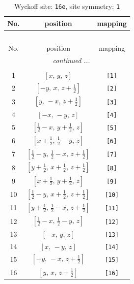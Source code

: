 \documentclass[fleqn,8pt]{jsarticle}
\begin{document}
\begin{longtable}{ccc}
\caption{Wyckoff site: {\tt 16e}, site symmetry: {\tt 1}}
 \\
 \hline \hline
No. & position & mapping \\ \hline \endfirsthead

\multicolumn{2}{l}{\tablename\ \thetable{}} \\
 \hline \hline
No. & position & mapping \\ \hline \endhead

 \hline \hline
\multicolumn{2}{r}{\footnotesize\it continued ...} \\ \endfoot

 \hline \hline
\multicolumn{2}{r}{} \\ \endlastfoot

1 & $\left[ x,\, y,\, z \right]$ & {\tt [1]} \\ \hline
2 & $\left[ - y,\, x,\, z + \frac{1}{2} \right]$ & {\tt [2]} \\ \hline
3 & $\left[ y,\, - x,\, z + \frac{1}{2} \right]$ & {\tt [3]} \\ \hline
4 & $\left[ - x,\, - y,\, z \right]$ & {\tt [4]} \\ \hline
5 & $\left[ \frac{1}{2} - x,\, y + \frac{1}{2},\, z \right]$ & {\tt [5]} \\ \hline
6 & $\left[ x + \frac{1}{2},\, \frac{1}{2} - y,\, z \right]$ & {\tt [6]} \\ \hline
7 & $\left[ \frac{1}{2} - y,\, \frac{1}{2} - x,\, z + \frac{1}{2} \right]$ & {\tt [7]} \\ \hline
8 & $\left[ y + \frac{1}{2},\, x + \frac{1}{2},\, z + \frac{1}{2} \right]$ & {\tt [8]} \\ \hline
9 & $\left[ x + \frac{1}{2},\, y + \frac{1}{2},\, z \right]$ & {\tt [9]} \\ \hline
10 & $\left[ \frac{1}{2} - y,\, x + \frac{1}{2},\, z + \frac{1}{2} \right]$ & {\tt [10]} \\ \hline
11 & $\left[ y + \frac{1}{2},\, \frac{1}{2} - x,\, z + \frac{1}{2} \right]$ & {\tt [11]} \\ \hline
12 & $\left[ \frac{1}{2} - x,\, \frac{1}{2} - y,\, z \right]$ & {\tt [12]} \\ \hline
13 & $\left[ - x,\, y,\, z \right]$ & {\tt [13]} \\ \hline
14 & $\left[ x,\, - y,\, z \right]$ & {\tt [14]} \\ \hline
15 & $\left[ - y,\, - x,\, z + \frac{1}{2} \right]$ & {\tt [15]} \\ \hline
16 & $\left[ y,\, x,\, z + \frac{1}{2} \right]$ & {\tt [16]} \\
\end{longtable}
\end{document}
